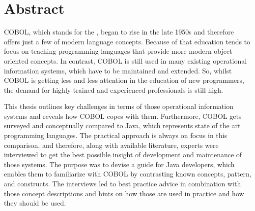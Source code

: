 \chapter*{Abstract} 

COBOL, which stands for the , began to rise in the late 1950s and therefore offers just a few of modern language concepts. Because of that education tends to focus on teaching programming languages that provide more modern object-oriented concepts. In contrast, COBOL is still used in many existing operational information systems, which have to be maintained and extended. So, whilst COBOL is getting less and less attention in the education of new programmers, the demand for highly trained and experienced professionals is still high. 

This thesis outlines key challenges in terms of those operational information systems and reveals how COBOL copes with them. Furthermore, COBOL gets surveyed and conceptually compared to Java, which represents state of the art programming languages. The practical approach is always on focus in this comparison, and therefore, along with available literature, experts were interviewed to get the best possible insight of development and maintenance of those systems. The purpose was to devise a guide for Java developers, which enables them to familiarize with COBOL by contrasting known concepts, pattern, and constructs. The interviews led to best practice advice in combination with those concept descriptions and hints on how those are used in practice and how they should be used.